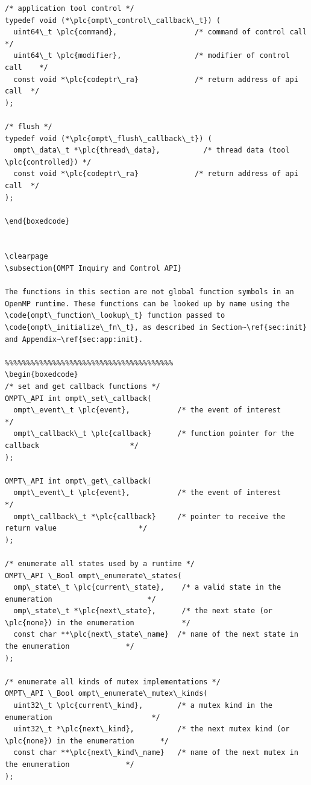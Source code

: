 \documentclass{article}
\begin{document}
\begin{boxedcode}
\begin{verbatim}
/* application tool control */
typedef void (*\plc{ompt\_control\_callback\_t}) (
  uint64\_t \plc{command},                  /* command of control call     */
  uint64\_t \plc{modifier},                 /* modifier of control call    */
  const void *\plc{codeptr\_ra}             /* return address of api call  */
);

/* flush */
typedef void (*\plc{ompt\_flush\_callback\_t}) (
  ompt\_data\_t *\plc{thread\_data},          /* thread data (tool \plc{controlled}) */
  const void *\plc{codeptr\_ra}             /* return address of api call  */
);

\end{boxedcode}


\clearpage
\subsection{OMPT Inquiry and Control API}

The functions in this section are not global function symbols in an OpenMP runtime. These functions can be looked up by name using the \code{ompt\_function\_lookup\_t} function passed to \code{ompt\_initialize\_fn\_t}, as described in Section~\ref{sec:init} and Appendix~\ref{sec:app:init}.

%%%%%%%%%%%%%%%%%%%%%%%%%%%%%%%%%%%%%%%
\begin{boxedcode}
/* set and get callback functions */
OMPT\_API int ompt\_set\_callback( 
  ompt\_event\_t \plc{event},           /* the event of interest                                 */
  ompt\_callback\_t \plc{callback}      /* function pointer for the callback                     */
);

OMPT\_API int ompt\_get\_callback(
  ompt\_event\_t \plc{event},           /* the event of interest                                 */
  ompt\_callback\_t *\plc{callback}     /* pointer to receive the return value                   */
);

/* enumerate all states used by a runtime */
OMPT\_API \_Bool ompt\_enumerate\_states(
  omp\_state\_t \plc{current\_state},    /* a valid state in the enumeration                      */
  omp\_state\_t *\plc{next\_state},      /* the next state (or \plc{none}) in the enumeration           */
  const char **\plc{next\_state\_name}  /* name of the next state in the enumeration             */
);

/* enumerate all kinds of mutex implementations */
OMPT\_API \_Bool ompt\_enumerate\_mutex\_kinds(
  uint32\_t \plc{current\_kind},        /* a mutex kind in the enumeration                       */
  uint32\_t *\plc{next\_kind},          /* the next mutex kind (or \plc{none}) in the enumeration      */
  const char **\plc{next\_kind\_name}   /* name of the next mutex in the enumeration             */
);


\end{verbatim}
\end{boxedcode}
\end{document}
